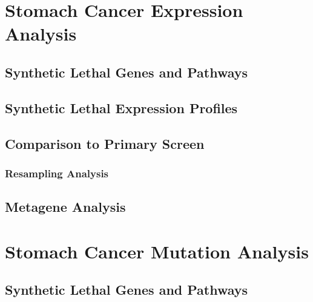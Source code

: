 \FloatBarrier

\chapter{Stomach Cancer Expression Analysis}
\label{appendix:stad_exprSL}

\section{Synthetic Lethal Genes and Pathways} %

\section{Synthetic Lethal Expression Profiles} %

\section{Comparison to Primary Screen}

\subsection{Resampling Analysis}  %

\section{Metagene Analysis} %

\FloatBarrier

\chapter{Stomach Cancer Mutation Analysis}
\label{appendix:stad_mtSL}

\section{Synthetic Lethal Genes and Pathways} \label{results:stad_mtSL_genes}

